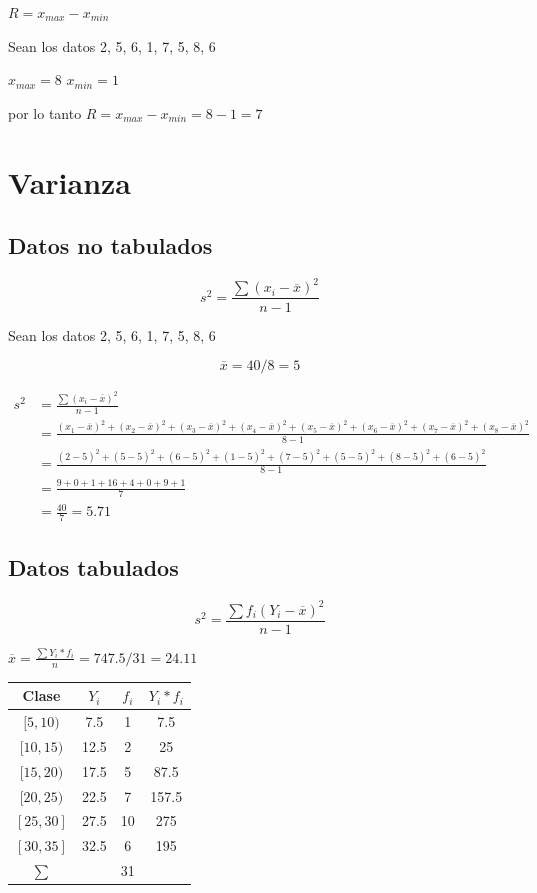 \documentclass[10pt,]{krantz}
\theoremstyle{definition}
\theoremstyle{definition}
\theoremstyle{definition}
\theoremstyle{definition}
\theoremstyle{remark}
\begin{document}
\(R=x_{max}-x_{min}\)

Sean los datos 2, 5, 6, 1, 7, 5, 8, 6

\(x_{max}=8\) \(x_{min}=1\)

por lo tanto \(R=x_{max}-x_{min}=8-1=7\)

\hypertarget{varianza}{%
\section{Varianza}\label{varianza}}

\hypertarget{datos-no-tabulados}{%
\subsection{Datos no tabulados}\label{datos-no-tabulados}}

\[s^2=\frac{\sum\left(x_i-\overline{x}\right )^2}{n-1}\]

Sean los datos 2, 5, 6, 1, 7, 5, 8, 6

\[\overline{x}=40/8=5\]

\[
\begin{aligned}
s^2&=\frac{\sum\left(x_i-\overline{x}\right )^2}{n-1}\\
&=\frac{\left(x_1-\overline{x}\right )^2+\left(x_2-\overline{x}\right )^2+\left(x_3-\overline{x}\right )^2+\left(x_4-\overline{x}\right )^2+\left(x_5-\overline{x}\right )^2+\left(x_6-\overline{x}\right )^2+\left(x_7-\overline{x}\right )^2+\left(x_8-\overline{x}\right )^2}{8-1}\\
&=\frac{\left(2-5\right )^2+\left(5-5\right )^2+\left(6-5\right )^2+\left(1-5\right )^2+\left(7-5\right )^2+\left(5-5\right )^2+\left(8-5\right )^2+\left(6-5\right )^2}{8-1}\\
&=\frac{9+0+1+16+4+0+9+1}{7}\\
&=\frac{40}{7}=5.71
\end{aligned}
\]

\hypertarget{datos-tabulados}{%
\subsection{Datos tabulados}\label{datos-tabulados}}

\[s^2=\frac{\sum f_i\left(Y_i-\overline{x}\right )^2}{n-1}\]

\(\overline{x}=\frac{\sum Y_i*f_i}{n}=747.5/31=24.11\)

\begin{longtable}[]{@{}cccc@{}}
\toprule
Clase & \(Y_i\) & \(f_i\) & \(Y_i*f_i\)\tabularnewline
\midrule
\endhead
\([5,10)\) & 7.5 & 1 & 7.5\tabularnewline
\([10,15)\) & 12.5 & 2 & 25\tabularnewline
\([15,20)\) & 17.5 & 5 & 87.5\tabularnewline
\([20,25)\) & 22.5 & 7 & 157.5\tabularnewline
\([25,30]\) & 27.5 & 10 & 275\tabularnewline
\([30,35]\) & 32.5 & 6 & 195\tabularnewline
\(\sum\) & & 31 &\tabularnewline
\bottomrule
\end{longtable}
\end{document}
